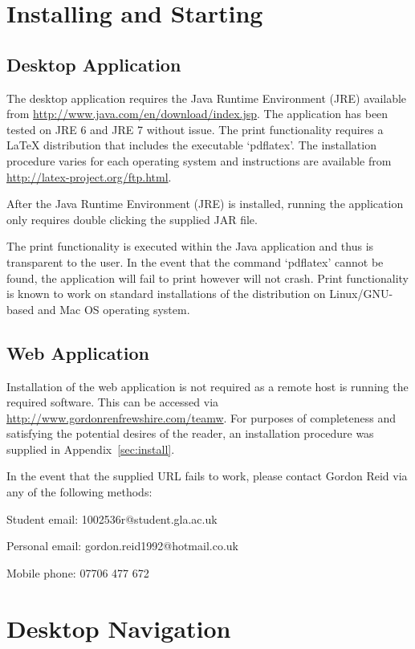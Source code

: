 \section{Installing and Starting}

\subsection{Desktop Application}

The desktop application requires the Java Runtime Environment (JRE) available
from \url{http://www.java.com/en/download/index.jsp}. The application has been
tested on JRE 6 and JRE 7 without issue. The print functionality requires a
LaTeX distribution that includes the executable `pdflatex'. The installation
procedure varies for each operating system and instructions are available from
\url{http://latex-project.org/ftp.html}.

After the Java Runtime Environment (JRE) is installed, running the application
only requires double clicking the supplied JAR file.

The print functionality is executed within the Java application and thus is
transparent to the user. In the event that the command `pdflatex' cannot be
found, the application will fail to print however will not crash. Print
functionality is known to work on standard installations of the distribution on
Linux/GNU-based and Mac OS operating system.

\subsection{Web Application}

Installation of the web application is not required as a remote host is running
the required software. This can be accessed via
\url{http://www.gordonrenfrewshire.com/teamw}. For purposes of completeness and
satisfying the potential desires of the reader, an installation procedure was
supplied in Appendix~\ref{sec:install}.

In the event that the supplied URL fails to work, please contact Gordon Reid via
any of the following methods:

Student email: 1002536r@student.gla.ac.uk

Personal email: gordon.reid1992@hotmail.co.uk

Mobile phone: 07706 477 672

\section{Desktop Navigation}

